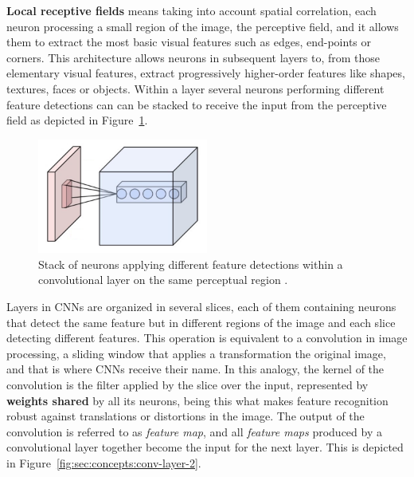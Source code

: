 \textbf{Local receptive fields} means taking into account spatial correlation, each neuron processing a small region of the image, the perceptive field, and it allows them to extract the most basic visual features such as edges, end-points or corners.
This architecture allows neurons in subsequent layers to, from those elementary visual features, extract progressively higher-order features like shapes, textures, faces or objects.
Within a layer several neurons performing different feature detections can can be stacked to receive the input from the perceptive field as depicted in Figure~\ref{fig:sec:concepts:conv-layer-1}.

\begin{figure}[htb]
  \begin{center}
    \includegraphics[width=0.5\textwidth]{gfx/conv-layer-1}
  \end{center}
  \caption{Stack of neurons applying different feature detections within a convolutional layer on the same perceptual region \cite{Aphex342015}.}
  \label{fig:sec:concepts:conv-layer-1}
\end{figure}

Layers in CNNs are organized in several slices, each of them containing neurons that detect the same feature but in different regions of the image and each slice detecting different features.
This operation is equivalent to a convolution in image processing, a sliding window that applies a transformation the original image, and that is where CNNs receive their name.
In this analogy, the kernel of the convolution is the filter applied by the slice over the input, represented by \textbf{weights shared} by all its neurons, being this what makes feature recognition robust against translations or distortions in the image.
The output of the convolution is referred to as \emph{feature map}, and all \emph{feature maps} produced by a convolutional layer together become the input for the next layer.
This is depicted in Figure~\ref{fig:sec:concepts:conv-layer-2}.

